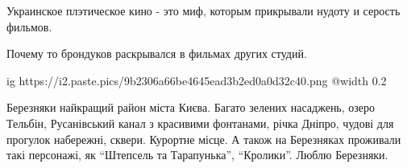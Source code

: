 \begin{itemize}

Украинское плэтическое кино - это миф, которым прикрывали нудоту и серость
фильмов.

Почему то брондуков раскрывался в фильмах других студий.


\ifcmt
  ig https://i2.paste.pics/9b2306a66be4645ead3b2ed0a0d32c40.png
  @width 0.2
\fi


Березняки найкращий район міста Києва. Багато зелених насаджень, озеро Тельбін,
Русанівський канал з красивими фонтанами, річка Дніпро, чудові для прогулок
набережні, сквери. Курортне місце. А також на Березняках проживали такі
персонажі, як \enquote{Штепсель та Тарапунька}, \enquote{Кролики}. Люблю Березняки.


\end{itemize} %
